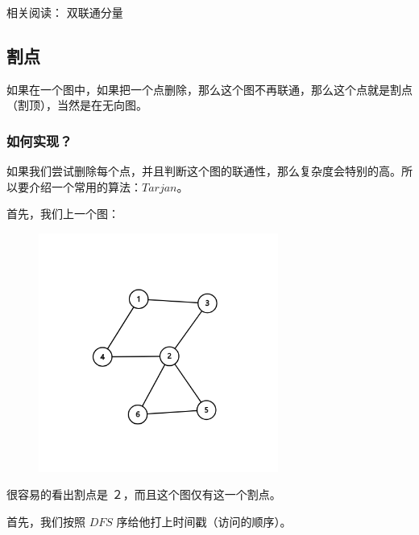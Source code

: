 
相关阅读： 双联通分量 

\subsection{割点}

\begin{QUOTE}{}{}
如果在一个图中，如果把一个点删除，那么这个图不再联通，那么这个点就是割点（割顶），当然是在无向图。
\end{QUOTE}

\subsubsection{如何实现？}

如果我们尝试删除每个点，并且判断这个图的联通性，那么复杂度会特别的高。所以要介绍一个常用的算法：$Tarjan$。

首先，我们上一个图：

\begin{figure}[htbp]
\centering
\includegraphics[width=0.7\textwidth]{docs/graph/images/bridge1.png} 

\end{figure}

很容易的看出割点是 ２，而且这个图仅有这一个割点。

首先，我们按照 $DFS$ 序给他打上时间戳（访问的顺序）。

